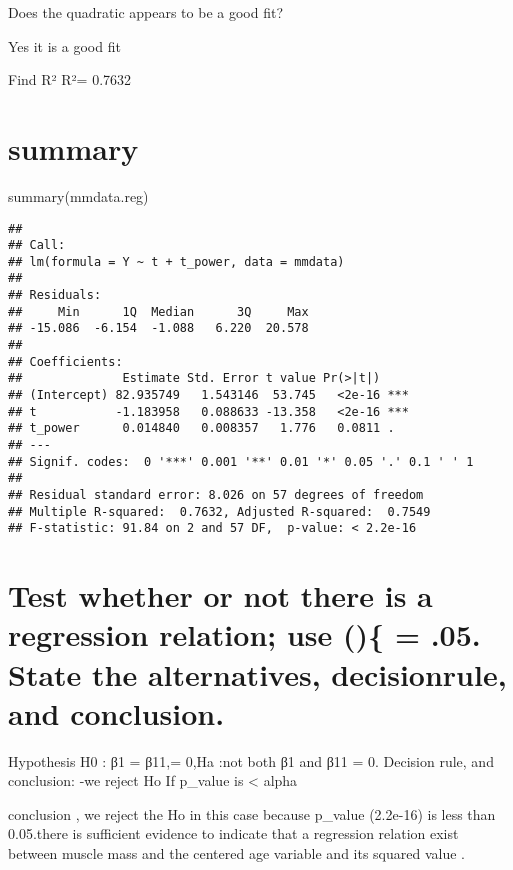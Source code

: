 \documentclass[
]{article}
\newenvironment{Shaded}{\begin{snugshade}}{\end{snugshade}}
\newcommand{\FunctionTok}[1]{\textcolor[rgb]{0.00,0.00,0.00}{#1}}
\newcommand{\NormalTok}[1]{#1}
\begin{document}
Does the quadratic appears to be a good fit?

Yes it is a good fit

Find R² R²= 0.7632

\hypertarget{summary}{%
\section{summary}\label{summary}}

\begin{Shaded}
\begin{Highlighting}[]
\FunctionTok{summary}\NormalTok{(mmdata.reg)}
\end{Highlighting}
\end{Shaded}

\begin{verbatim}
## 
## Call:
## lm(formula = Y ~ t + t_power, data = mmdata)
## 
## Residuals:
##     Min      1Q  Median      3Q     Max 
## -15.086  -6.154  -1.088   6.220  20.578 
## 
## Coefficients:
##              Estimate Std. Error t value Pr(>|t|)    
## (Intercept) 82.935749   1.543146  53.745   <2e-16 ***
## t           -1.183958   0.088633 -13.358   <2e-16 ***
## t_power      0.014840   0.008357   1.776   0.0811 .  
## ---
## Signif. codes:  0 '***' 0.001 '**' 0.01 '*' 0.05 '.' 0.1 ' ' 1
## 
## Residual standard error: 8.026 on 57 degrees of freedom
## Multiple R-squared:  0.7632, Adjusted R-squared:  0.7549 
## F-statistic: 91.84 on 2 and 57 DF,  p-value: < 2.2e-16
\end{verbatim}

\hypertarget{test-whether-or-not-there-is-a-regression-relation-use-.05.-state-the-alternatives-decisionrule-and-conclusion.}{%
\section{Test whether or not there is a regression relation; use ()\{ =
.05. State the alternatives, decisionrule, and
conclusion.}\label{test-whether-or-not-there-is-a-regression-relation-use-.05.-state-the-alternatives-decisionrule-and-conclusion.}}

Hypothesis H0 : β1 = β11,= 0,Ha :not both β1 and β11 = 0. Decision rule,
and conclusion: -we reject Ho If p\_value is \textless{} alpha

conclusion , we reject the Ho in this case because p\_value (2.2e-16) is
less than 0.05.there is sufficient evidence to indicate that a
regression relation exist between muscle mass and the centered age
variable and its squared value .
\end{document}
